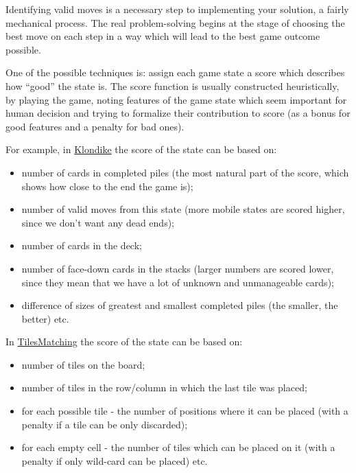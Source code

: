 Identifying valid moves is a necessary step to implementing your
solution, a fairly mechanical process. The real problem-solving begins
at the stage of choosing the best move on each step in a way which will
lead to the best game outcome possible.

One of the possible techniques is: assign each game state a score which
describes how ``good'' the state is. The score function is usually
constructed heuristically, by playing the game, noting features of the
game state which seem important for human decision and trying to
formalize their contribution to score (as a bonus for good features and
a penalty for bad ones).

For example, in
\href{http://www.topcoder.com/longcontest/?module=ViewProblemStatement\&rd=13565\&pm=10014}{Klondike}
the score of the state can be based on:

\begin{itemize}
\item
  number of cards in completed piles (the most natural part of the
  score, which shows how close to the end the game is);
\item
  number of valid moves from this state (more mobile states are scored
  higher, since we don't want any dead ends);
\item
  number of cards in the deck;
\item
  number of face-down cards in the stacks (larger numbers are scored
  lower, since they mean that we have a lot of unknown and unmanageable
  cards);
\item
  difference of sizes of greatest and smallest completed piles (the
  smaller, the better) etc.
\end{itemize}

In
\href{http://www.topcoder.com/longcontest/?module=ViewProblemStatement\&rd=13795\&pm=10410}{TilesMatching}
the score of the state can be based on:

\begin{itemize}
\item
  number of tiles on the board;
\item
  number of tiles in the row/column in which the last tile was placed;
\item
  for each possible tile - the number of positions where it can be
  placed (with a penalty if a tile can be only discarded);
\item
  for each empty cell - the number of tiles which can be placed on it
  (with a penalty if only wild-card can be placed) etc.
\end{itemize}

